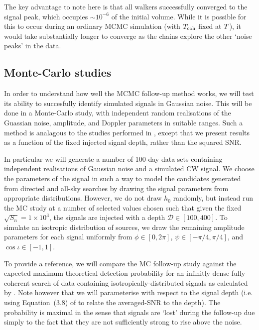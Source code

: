 \documentclass[aps, prd, twocolumn, superscriptaddress, floatfix, showpacs, nofootinbib, longbibliography]{revtex4-1}
\begin{document}
The key advantage to note here is that all walkers successfully converged to the
signal peak, which occupies $\sim 10^{-6}$ of the initial volume. While it is
possible for this to occur during an ordinary MCMC simulation (with $T_{\rm coh}$
fixed at $T$), it would take substantially longer to converge as the
chains explore the other `noise peaks' in the data.

\subsection{Monte-Carlo studies}
\label{sec_MCS_zoom}

In order to understand how well the MCMC follow-up method works, we will test
its ability to succesfully identify simulated signals in Gaussian noise. This will be
done in a Monte-Carlo study, with independent random realisations of the
Guassian noise, amplitude, and Doppler parameters in suitable ranges. Such a
method is analagous to the studies performed in \citet{shaltev2013}, except
that we present results as a function of the fixed injected signal depth,
rather than the squared SNR.

In particular we will generate a number of 100-day data sets containing
independent realisations of Gaussian noise and a simulated CW signal. We choose
the parameters of the signal in such a way to model the candidates generated
from directed and all-sky searches by drawing the signal parameters from
appropriate distributions. However, we do not draw $h_0$ randomly, but instead
run the MC study at a number of selected values chosen such that given the
fixed $\sqrt{S_n}=1\times10^{3}$, the signals are injected with a depth
$\mathcal{D} \in [100, 400]$.  To simulate an isotropic distribution of
sources, we draw the remaining amplitude parameters for each signal uniformly
from $\phi \in [0, 2\pi]$, $\psi \in [-\pi/4, \pi/4]$, and $\cos\iota \in [-1,
1]$.

To provide a reference, we will compare the MC follow-up study against the
expected maximum theoretical detection probability for an infinitly dense
fully-coherent search of data containing isotropically-distributed signals as
calculated by \citet{wette2012}. Note however that we will parameterise with
respect to the signal depth (i.e. using Equation~(3.8) of \citet{wette2012} to
relate the averaged-SNR to the depth). The probability is maximal in the
sense that signals are `lost' during the follow-up due simply to the fact that
they are not sufficiently strong to rise above the noise.
\end{document}
